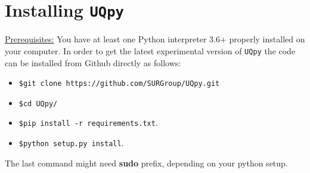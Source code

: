 

\section{Installing \texttt{UQpy}}

\underline{Prerequisites:}
You have at least one Python interpreter 3.6+ properly installed on your computer. In order to get the latest experimental version of  \texttt{UQpy} the code can be installed from Github directly as follows:

\begin{itemize}
\item[ ]  \texttt{\$git clone https://github.com/SURGroup/UQpy.git}
\item[ ] \texttt{\$cd UQpy/}
\item[ ] \texttt{\$pip install -r  requirements.txt}.
\item[ ]  \texttt{\$python setup.py install}.
\end{itemize}

\noindent
The last command might need \textbf{sudo} prefix, depending on your python setup. 

